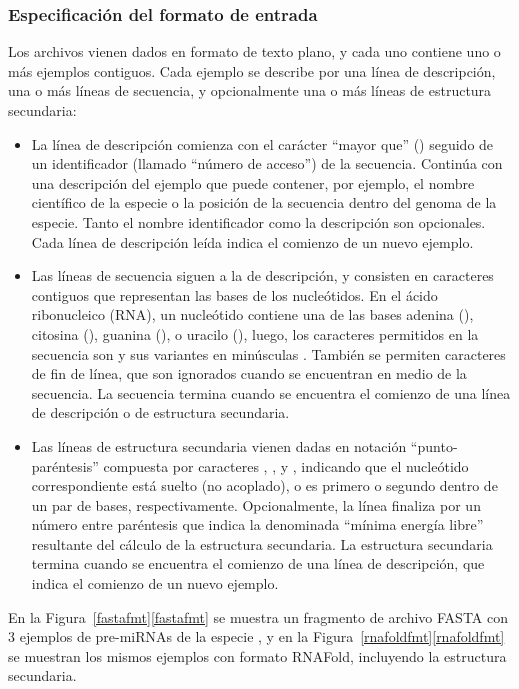%
%
\subsubsection{Especificación del formato de entrada}
%
Los archivos vienen dados en formato de texto plano, y cada uno
contiene uno o más ejemplos contiguos.
Cada ejemplo se describe por una línea de descripción, una o más
líneas de secuencia, y opcionalmente una o más líneas de estructura
secundaria:
%
\begin{itemize}
\item
  La línea de descripción comienza con el carácter ``mayor que''
  (\mono{>}) seguido de un identificador (llamado ``número de
  acceso'') de la secuencia.
  Continúa con una descripción del ejemplo que puede contener, por
  ejemplo, el nombre científico de la especie o la posición de la
  secuencia dentro del genoma de la especie.
  Tanto el nombre identificador como la descripción son opcionales.
  Cada línea de descripción leída indica el comienzo de un nuevo
  ejemplo.
\item
  Las líneas de secuencia siguen a la de descripción, y consisten en
  caracteres contiguos que representan las bases de los nucleótidos.
  En el ácido ribonucleico (RNA), un nucleótido contiene una de las
  bases adenina (), citosina (), guanina (), o
  uracilo (), luego, los caracteres permitidos en la secuencia
  son  y sus variantes en minúsculas .
  También se permiten caracteres de fin de línea, que son ignorados
  cuando se encuentran en medio de la secuencia.
  La secuencia termina cuando se encuentra el comienzo de una línea de
  descripción o de estructura secundaria.
\item
  Las líneas de estructura secundaria vienen dadas en notación
  ``punto-paréntesis'' compuesta por caracteres , \mono{(}, y
  \mono{)}, indicando que el nucleótido correspondiente está suelto
  (no acoplado), o es primero o segundo dentro de un par de bases,
  respectivamente.
  Opcionalmente, la línea finaliza por un número entre paréntesis que
  indica la denominada ``mínima energía libre'' resultante del cálculo
  de la estructura secundaria.
  La estructura secundaria termina cuando se encuentra el comienzo de
  una línea de descripción, que indica el comienzo de un nuevo
  ejemplo.
\end{itemize}
%
En la \iflatexml{}Figura~\ref{fastafmt}\else\autoref{fastafmt}\fi{} se
muestra un fragmento de archivo FASTA con 3 ejemplos de pre-miRNAs de
la especie , y en la
\iflatexml{}Figura~\ref{rnafoldfmt}\else\autoref{rnafoldfmt}\fi{} se
muestran los mismos ejemplos con formato RNAFold, incluyendo la
estructura secundaria.
